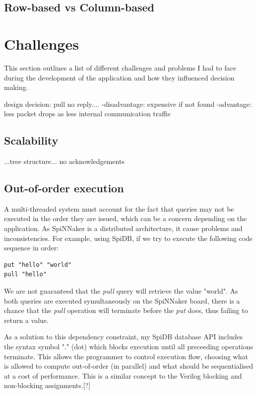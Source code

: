 \subsection{Row-based vs Column-based}

\section{Challenges}
This section outlines a list of different challenges and problems I had to face during the development of the application and how they influenced decision making.


design decision: pull no reply....
-disadvantage: expensive if not found
-advantage: less packet drops as less internal communication traffic

\subsection{Scalability}
...tree structure...
no acknowledgements

\subsection{Out-of-order execution}
\label{sec:out-of-order}
A multi-threaded system must account for the fact that queries may not be executed in the order they are issued, which can be a concern depending on the application. As SpiNNaker is a distributed architecture, it cause problems and inconsistencies.
For example, using SpiDB, if we try to execute the following code sequence in order:\\
\begin{lstlisting}[caption={Non-blocking execution}, label=list:non-blocking]
put "hello" "world"
pull "hello"
\end{lstlisting}

We are not guaranteed that the \textit{pull} query will retrieve the value "world". As both queries are executed symultaneously on the SpiNNaker board, there is a chance that the \textit{pull} operation will terminate before the \textit{put} does, thus failing to return a value.

As a solution to this dependency constraint, my SpiDB database API includes the syntax symbol "." (dot) which blocks execution until all preceeding operations terminate. This allows the programmer to control execution flow, choosing what is allowed to compute out-of-order (in parallel) and what should be sequentialised at a cost of performance. This is a similar concept to the Verilog blocking and non-blocking assignments.[?]

